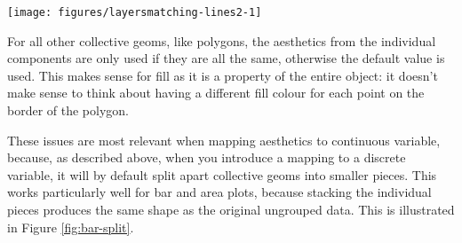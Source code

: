 \begin{Shaded}
\begin{Highlighting}[]
\NormalTok{>}\StringTok{ }\StringTok{ }\NormalTok{(} \NormalTok{))}
\NormalTok{>}\StringTok{ }\StringTok{ }\NormalTok{(}
\NormalTok{+}\StringTok{   } 
\NormalTok{+}\StringTok{   }  
\NormalTok{+}\StringTok{   }  
\NormalTok{+}\StringTok{ }\NormalTok{)}
\NormalTok{>}\StringTok{ }   \NormalTok{(}\NormalTok{)) +}\StringTok{ }
\NormalTok{+}\StringTok{   }\NormalTok{(}  \NormalTok{)}
\end{Highlighting}
\end{Shaded}

\begin{flushleft}\texttt{[image: figures/layersmatching-lines2-1]} \end{flushleft}

For all other collective geoms, like polygons, the aesthetics from the
individual components are only used if they are all the same, otherwise
the default value is used. This makes sense for fill as it is a property
of the entire object: it doesn't make sense to think about having a
different fill colour for each point on the border of the polygon.

These issues are most relevant when mapping aesthetics to continuous
variable, because, as described above, when you introduce a mapping to a
discrete variable, it will by default split apart collective geoms into
smaller pieces. This works particularly well for bar and area plots,
because stacking the individual pieces produces the same shape as the
original ungrouped data. This is illustrated in Figure
\ref{fig:bar-split}.

\begin{Shaded}
\begin{Highlighting}[]
 
  
\end{Highlighting}
\end{Shaded}

